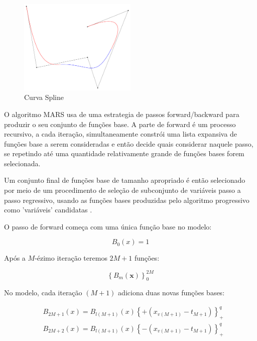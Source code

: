 \documentclass[
    12pt,               %
    openright,          %
    oneside,            %
    a4paper,            %
    english,            %
    brazil              %
    ]{abntex2}
\begin{document}
\begin{figure}[H]
    \centering
    \caption{\label{Curva Spline}Curva Spline}
    \includegraphics[width=0.50\textwidth]{../Imgs/B-spline_curve.png}
\end{figure}

O algoritmo MARS usa de uma estrategia de passos forward/backward para produzir o seu conjunto de funções base. A parte de forward é um
processo recursivo, a cada iteração, simultaneamente constrói uma lista expansiva de funções base a serem consideradas e então decide 
quais considerar naquele passo, se repetindo até uma quantidade relativamente grande de funções bases forem selecionada. 

Um conjunto final de funções base de tamanho apropriado é então selecionado por meio de um procedimento de seleção de subconjunto de 
variáveis passo a passo regressivo, usando as funções bases produzidas pelo algoritmo progressivo como 'variáveis' 
candidatas \cite{intro_mars}.

O passo de forward começa com uma única função base no modelo:

\begin{equation}
    \label{inicio_funcao_base}
    B_0(x) = 1
\end{equation}

Após a $M$-ézimo iteração teremos $2M+1$ funções:

\begin{equation}
    \label{funcao_base}
    \left\{B_m(\mathbf{x})\right\}_{0}^{2M}
\end{equation}

No modelo, cada iteração $(M + 1)$ adiciona duas novas funções bases:

\begin{equation}
    \label{novas_funcoes}
    \begin{split}
        & B_{2M+1}(x) = B_{l(M+1)}(x)\left\{+(x_{v(M+1)}-t_{M+1})\right\}_{+}^{q} \\
        & B_{2M+2}(x) = B_{l(M+1)}(x)\left\{-(x_{v(M+1)}-t_{M+1})\right\}_{+}^{q} \\
    \end{split}
\end{equation}
\end{document}
